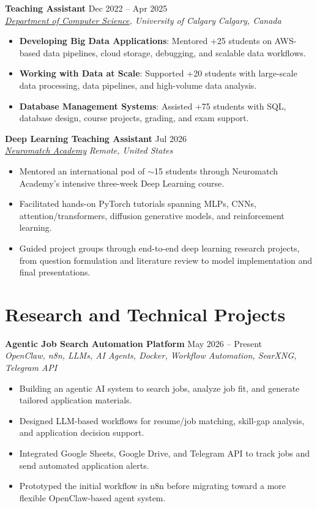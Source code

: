\documentclass[a4paper,10pt]{article}
\newcommand{\resumeSubheading}[4]{
    \textbf{#1} \hfill #2 \\
    \textit{#3} \hfill \textit{#4}
}
\begin{document}
\resumeSubheading
{Teaching Assistant}
{Dec 2022 -- Apr 2025}
{\href{https://science.ucalgary.ca/computer-science} {Department of Computer Science}, University of Calgary}
{Calgary, Canada}
\begin{itemize}[leftmargin=0.25in]
    \item \textbf{Developing Big Data Applications}: Mentored +25 students on AWS-based data pipelines, cloud storage, debugging, and scalable data workflows. 
    \item \textbf{Working with Data at Scale}: Supported +20 students with large-scale data processing, data pipelines, and high-volume data analysis. 
    \item \textbf{Database Management Systems}: Assisted +75 students with SQL, database design, course projects, grading, and exam support.
\end{itemize}

\resumeSubheading
{Deep Learning Teaching Assistant}
{Jul 2026}
{\href{https://neuromatch.io/}{Neuromatch Academy}}
{Remote, United States}
\begin{itemize}[leftmargin=0.25in]
    \item Mentored an international pod of $\sim$15 students through Neuromatch Academy's intensive three-week Deep Learning course.
    \item Facilitated hands-on PyTorch tutorials spanning MLPs, CNNs, attention/transformers, diffusion generative models, and reinforcement learning.
    \item Guided project groups through end-to-end deep learning research projects, from question formulation and literature review to model implementation and final presentations.
\end{itemize}


\section*{Research and Technical Projects}

\noindent
\textbf{Agentic Job Search Automation Platform} \hfill May 2026 -- Present \\
\textit{OpenClaw, n8n, LLMs, AI Agents, Docker, Workflow Automation, SearXNG, Telegram API}
\begin{itemize}[leftmargin=0.25in]
    \item Building an agentic AI system to search jobs, analyze job fit, and generate tailored application materials.
    \item Designed LLM-based workflows for resume/job matching, skill-gap analysis, and application decision support.
    \item Integrated Google Sheets, Google Drive, and Telegram API to track jobs and send automated application alerts.
    \item Prototyped the initial workflow in n8n before migrating toward a more flexible OpenClaw-based agent system.
\end{itemize}
\end{document}
